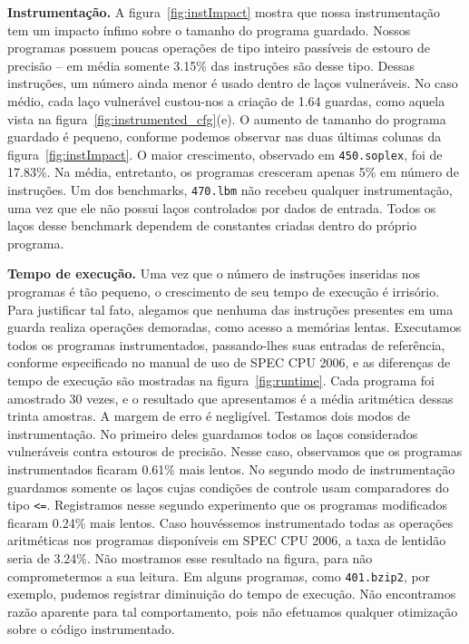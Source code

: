 \documentclass{llncs}
\begin{document}
\noindent
\textbf{Instrumentação. }
A figura~\ref{fig:instImpact} mostra que nossa instrumentação tem um
impacto ínfimo sobre o tamanho do programa guardado.
Nossos programas possuem poucas operações de tipo inteiro passíveis de estouro
de precisão -- em média somente 3.15\% das instruções são desse tipo.
Dessas instruções, um número ainda menor é usado dentro de laços vulneráveis.
No caso médio, cada laço vulnerável custou-nos a criação de 1.64 guardas, como
aquela vista na figura~\ref{fig:instrumented_cfg}(e).
O aumento de tamanho do programa guardado é pequeno, conforme podemos
observar nas duas últimas colunas da figura~\ref{fig:instImpact}.
O maior crescimento, observado em \texttt{450.soplex}, foi de 17.83\%.
Na média, entretanto, os programas cresceram apenas 5\% em número de
instruções.
Um dos benchmarks, \texttt{470.lbm} não recebeu qualquer instrumentação,
uma vez que ele não possui laços controlados por dados de entrada.
Todos os laços desse benchmark dependem de constantes criadas dentro do próprio
programa.

\noindent
\textbf{Tempo de execução. }
Uma vez que o número de instruções inseridas nos programas é tão pequeno, o
crescimento de seu tempo de execução é irrisório.
Para justificar tal fato, alegamos que nenhuma das instruções presentes em
uma guarda realiza operações demoradas, como acesso a memórias lentas.
Executamos todos os programas instrumentados, passando-lhes suas entradas de
referência, conforme especificado no manual de uso de SPEC CPU 2006, e as
diferenças de tempo de execução são mostradas na figura~\ref{fig:runtime}.
Cada programa foi amostrado 30 vezes, e o resultado que apresentamos é a
média aritmética dessas trinta amostras.
A margem de erro é negligível.
Testamos dois modos de instrumentação.
No primeiro deles guardamos todos os laços considerados vulneráveis contra
estouros de precisão.
Nesse caso, observamos que os programas instrumentados ficaram 0.61\% mais
lentos.
No segundo modo de instrumentação guardamos somente os laços cujas condições
de controle usam comparadores do tipo \texttt{<=}.
Registramos nesse segundo experimento que os programas modificados ficaram
0.24\% mais lentos.
Caso houvéssemos instrumentado todas as operações aritméticas nos programas
disponíveis em SPEC CPU 2006, a taxa de lentidão seria de 3.24\%.
Não mostramos esse resultado na figura, para não comprometermos a sua
leitura.
Em alguns programas, como \texttt{401.bzip2}, por exemplo, pudemos registrar
diminuição do tempo de execução.
Não encontramos razão aparente para tal comportamento, pois não efetuamos
qualquer otimização sobre o código instrumentado.
\end{document}
